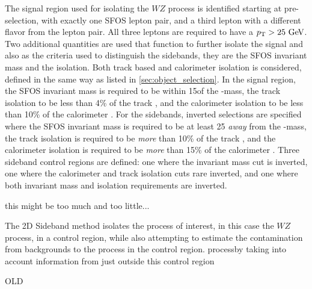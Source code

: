 The signal region used for isolating the $WZ$ process
is identified starting at pre-selection, with exactly 
one SFOS lepton pair, and a third lepton with a different
flavor from the lepton pair.  All three leptons are required
to have a $\pt > 25\GeV$. Two additional quantities are used
that function to further isolate the signal and 
also as the criteria used to distinguish the sidebands, they are 
the SFOS invariant mass and the isolation. Both track based
and calorimeter isolation is considered, defined in the same
way as listed in \sec\ref{sec:object_selection}.
In the signal region, the SFOS invariant mass is required
to be within 15\GeV of the \z-mass, the track isolation 
to be less than 4\% of the track \pt, and the calorimeter
isolation to be less than 10\% of the calorimeter \et.
For the sidebands, inverted selections are specified where
the SFOS invariant mass is required to be at least 25\GeV
\emph{away} from the \z-mass, the track isolation is
required to be \emph{more} than 10\% of the track \pt, and
the calorimeter isolation is required to be \emph{more} than
15\% of the calorimeter \et.
Three sideband control regions are defined: one
where the invariant mass cut is inverted, one where the calorimeter
and track isolation cuts rare inverted, and one where both invariant
mass and isolation requirements are inverted.

this might be too much and too little...







The 2D Sideband method isolates the process of interest, in this case
the $WZ$ process, in a control region, while also attempting
to estimate the contamination from backgrounds to the process in the control 
region. processby taking into account
information from just outside this control region 

OLD


